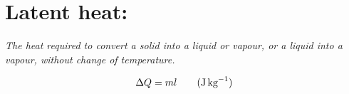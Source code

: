\documentclass[11pt]{article}
\begin{document}
\section{Latent heat: }
\begin{center}
	\textit{The heat required to convert a solid into a liquid or vapour, or a liquid into a vapour, without change of temperature.}
\end{center}

\begin{equation}
\Delta Q =ml\tag{\si{\joule\per\kg}}
\end{equation}

\begin{center}
	
\end{center}
\end{document}
